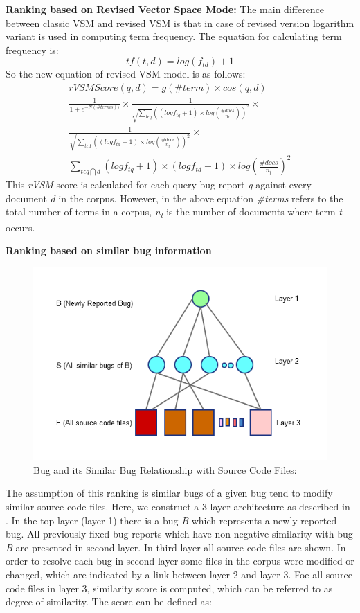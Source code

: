 \documentclass[conference]{IEEEtran}
\begin{document}
\textbf{Ranking based on Revised Vector Space Mode:}
The main difference between classic VSM and revised VSM is that in case of revised version logarithm variant is used in computing term frequency. The equation for calculating term frequency is:
\begin{equation}
tf(t,d)=log(f_{td})+1
\end{equation}
So the new equation of revised VSM model is as follows:
\begin{multline}\label{rVSMequation}
rVSMScore(q,d)=g(\#term)\times cos(q,d)
\\
\frac{1}{1+e^{-N(\#terms))}}\times \frac{1}{\sqrt{\sum_{t\epsilon q}}((logf_{tq}+1)\times log(\frac{\#docs}{n_{t}}))^{^{2}}}\times 
\\
\frac{1}{\sqrt{\sum_{t\epsilon d}((log {f_{td}+1})\times log(\frac{\#docs}{n_{t}}))^{2}}}\times
\\
\sum_{t\epsilon q\bigcap d}(logf_{tq}+1)\times (logf_{td}+1)\times log(\frac{\#docs}{n_{t}})^{2}
\end{multline}
This \textit{rVSM} score is calculated for each query bug report \textit{q} against every document \textit{d} in the corpus. However, in the above equation \textit{\#terms} refers to the total number of terms in a corpus, \textit{n\textsubscript{t}} is the number of documents where term \textit{t} occurs.

\textbf{Ranking based on similar bug information}
\begin{figure}
	\centering
	\includegraphics[scale=0.65]{3layers}
	\caption{Bug and its Similar Bug Relationship with Source Code Files:}
	\label{fig:BSBR}
\end{figure}
The assumption of this ranking is similar bugs of a given bug tend to modify similar source code files. Here, we construct a 3-layer architecture as described in \cite{Jian}. In the top layer (layer 1) there is a bug \textit{B} which represents a newly reported bug. All previously fixed bug reports which have non-negative similarity with bug  \textit{B} are presented in second layer. In third layer all source code files are shown. In order to resolve each bug in second layer some files in the corpus were modified or changed, which are indicated by a link between layer 2 and layer 3. Foe all source code files in layer 3, similarity score is computed, which can be referred to as degree of similarity. The score can be defined as:
\end{document}
